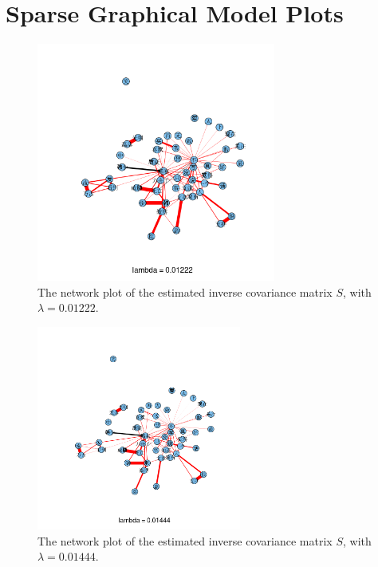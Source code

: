 \documentclass[11pt]{article}
\newcommand{\1}[1]{{\mathbf 1}\left\{#1\right\}}        %
\begin{document}
\newpage
\newpage




\newpage
\appendix


\section{Sparse Graphical Model Plots}\label{asec:sgm}

\begin{center}
\begin{figure}[!h]
   \centering
   \includegraphics[width=0.7\textwidth]{../gLassoResults/glasso2.png} 
      \caption{The network plot of the estimated inverse covariance matrix $S$, with $\lambda = 0.01222$.}
   \label{fig:glasso2}
\end{figure}
\end{center}

\begin{center}
\begin{figure}[!h]
   \centering
   \includegraphics[width=0.6\textwidth]{../gLassoResults/glasso3.png} 
      \caption{The network plot of the estimated inverse covariance matrix $S$, with $\lambda = 0.01444$.}
   \label{fig:glasso3}
\end{figure}
\end{center}
\end{document}
